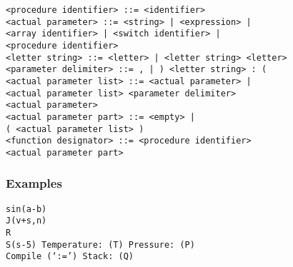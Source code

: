 \documentclass[a4paper,11pt]{article}
\begin{document}
\begin{flushleft}
\vspace{0.2em}\texttt{<procedure identifier> ::= <identifier>}\\

\vspace{0.2em}\texttt{<actual parameter> ::= <string> | <expression> |\\
  \hspace{1.0cm}<array identifier> | <switch identifier> |\\
  \hspace{1.0cm}<procedure identifier>}\\

\vspace{0.2em}\texttt{<letter string> ::= <letter> | <letter string> <letter>}\\

\vspace{0.2em}\texttt{<parameter delimiter> ::= , | ) <letter string> : (}\\

\vspace{0.2em}\texttt{<actual parameter list> ::= <actual parameter> |\\
  \hspace{1.0cm}<actual parameter list> <parameter delimiter>\\
  \hspace{1.0cm}<actual parameter>}\\

\vspace{0.2em}\texttt{<actual parameter part> ::= <empty> |\\
  \hspace{1.0cm}( <actual parameter list> )}\\

\vspace{0.2em}\texttt{<function designator> ::= <procedure identifier>\\
  \hspace{1.0cm}<actual parameter part>}\\
\end{flushleft}


\subsubsection{Examples}

\begin{flushleft}
\texttt{sin(a-b)\\
J(v+s,n)\\
R\\
S(s-5) Temperature: (T) Pressure: (P)\\
Compile (`:=') Stack: (Q)}\\
\end{flushleft}
\end{document}
